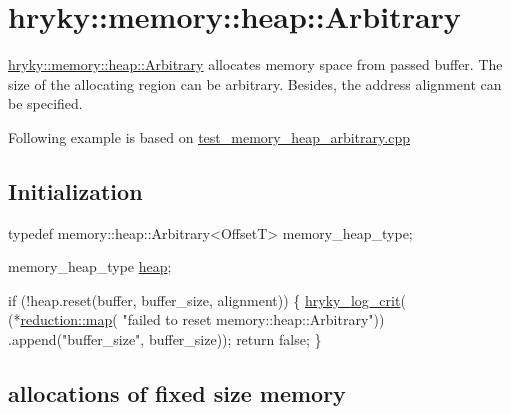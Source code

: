 \hypertarget{hryky_1_1memory_heap_Arbitrary}{}\section{hryky\-::memory\-::heap\-::\-Arbitrary}\label{hryky_1_1memory_heap_Arbitrary}
\hyperlink{classhryky_1_1memory_1_1heap_1_1_arbitrary}{hryky\-::memory\-::heap\-::\-Arbitrary} allocates memory space from passed buffer. The size of the allocating region can be arbitrary. Besides, the address alignment can be specified.

Following example is based on \hyperlink{test_memory_heap_arbitrary_8cpp-example}{test\-\_\-memory\-\_\-heap\-\_\-arbitrary.\-cpp}

\hypertarget{hryky_1_1task_Initialization}{}\subsection{Initialization}\label{hryky_1_1task_Initialization}

\begin{DoxyCodeInclude}
    \textcolor{keyword}{typedef} memory::heap::Arbitrary<OffsetT> memory\_heap\_type;

    memory\_heap\_type \hyperlink{namespacehryky_1_1memory_1_1global_a6fc6103f67c837aa0f39b359588409cd}{heap};

    \textcolor{keywordflow}{if} (!heap.reset(buffer, buffer\_size, alignment)) \{
        \hyperlink{log__writer__common_8h_a61bcce4d8e91e6fde78ce1be7d9ceac8}{hryky_log_crit}(
            (*\hyperlink{namespacehryky_1_1reduction_ac5eae270cf8047b294dc4ff3e5e11a79}{reduction::map}(
                \textcolor{stringliteral}{"failed to reset memory::heap::Arbitrary"}))
            .append(\textcolor{stringliteral}{"buffer\_size"}, buffer\_size));
        \textcolor{keywordflow}{return} \textcolor{keyword}{false};
    \}

\end{DoxyCodeInclude}
\hypertarget{hryky_1_1memory_allocation}{}\subsection{allocations of fixed size memory}\label{hryky_1_1memory_allocation}

